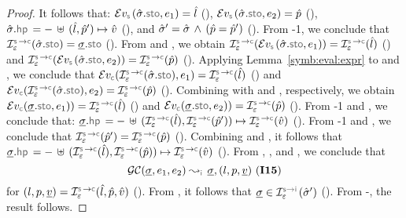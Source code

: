 \begin{proof}
 \noindent {} It follows that:  $\evalexpr{\symbolic}(\sstate.\stosel, \jsilexpr_1) = \sloc$ (), 
 $\evalexpr{\symbolic}(\sstate.\stosel, \jsilexpr_2) = \sexprp$ (), 
 $\sstate.\hpsel = - \, \uplus \, (\sloc, \sexprp') \mapsto \sexprv$ (), and
 $\hat{\sigma}' = \hat{\sigma} \, \wedge \, (\hat{p} = \hat{p}')$  (). 
 From \hyp{1}, we conclude that $\interpret{\symbconc}{\senv}(\sstate.\stosel) = \istate.\stosel$ (). 
 From  and , we obtain 
 $\interpret{\symbconc}{\senv}(\evalexpr{\symbolic}(\sstate.\stosel, \jsilexpr_1))= \interpret{\symbconc}{\senv}(\sloc)$ () 
 and 
 $\interpret{\symbconc}{\senv}(\evalexpr{\symbolic}(\sstate.\stosel, \jsilexpr_2))= \interpret{\symbconc}{\senv}(\sexprp)$ (). 
 Applying Lemma~\ref{symb:eval:expr} to  and , we conclude that 
$\evalexpr{\concrete}(\interpret{\symbconc}{\senv}(\sstate.\stosel), \jsilexpr_1) = \interpret{\symbconc}{\senv}(\sloc)$ ()
and 
$\evalexpr{\concrete}(\interpret{\symbconc}{\senv}(\sstate.\stosel), \jsilexpr_2) = \interpret{\symbconc}{\senv}(\sexprp)$ (). 
Combining  with  and , respectively, we obtain
 $\evalexpr{\concrete}(\istate.\stosel, \jsilexpr_1)) = \interpret{\symbconc}{\senv}(\sloc)$ ()
and 
$\evalexpr{\concrete}(\istate.\stosel, \jsilexpr_2)) = \interpret{\symbconc}{\senv}(\sexprp)$ (). 
From \hyp{1} and , we conclude that: 
 $\istate.\hpsel = - \, \uplus \, (\interpret{\symbconc}{\senv}(\sloc), \interpret{\symbconc}{\senv}(\sexprp')) \mapsto \interpret{\symbconc}{\senv}(\sexprv)$ (). 
 From \hyp{1} and , we conclude that $\interpret{\symbconc}{\senv}(\sexprp') = \interpret{\symbconc}{\senv}(\sexprp)$ (). 
 Combining  and , it follows that 
 $\istate.\hpsel = - \, \uplus \, (\interpret{\symbconc}{\senv}(\sloc), \interpret{\symbconc}{\senv}(\sexprp)) \mapsto \interpret{\symbconc}{\senv}(\sexprv)$ (). 
 From , , and , we conclude that 
 $$\absgetcellrule{\instrumented}{\istate, \jsilexpr_1, \jsilexpr_2}{\istate, (\loc, p, \ival)} \text{ (\ieq{15})}$$ 
 for $(\loc, p, \ival) =  \interpret{\symbconc}{\senv}(\sloc, \sexprp, \sexprv)$ (). 
 From , it follows that $\istate \in \interpret{\symbinst}{\senv}(\sstate')$ (). 
 From -, the result follows. 
 \vspace{3pt}
 

\end{proof}
